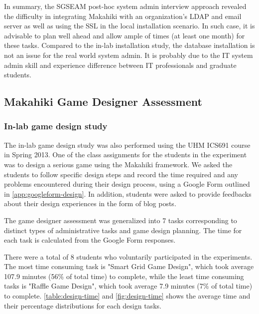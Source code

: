 In summary, the SGSEAM post-hoc system admin interview approach revealed the difficulty in integrating  Makahiki with an organization's LDAP and email server as well as using the SSL in the local installation scenario. In such case, it is advisable to plan well ahead and allow ample of times (at least one month) for these tasks.  Compared to the in-lab installation study, the database installation is not an issue for the real world system admin. It is probably due to the IT system admin skill and experience difference between  IT professionals and graduate students. 

\subsection{Makahiki Game Designer Assessment}

\subsubsection{In-lab game design study}

The in-lab game design study was also performed using the UHM ICS691 course in Spring 2013. One of the class assignments for the students in the experiment was to design a serious game using the Makahiki framework. We asked the students to follow specific design steps and record the time required and any problems encountered during their design process, using a Google Form outlined in \autoref{app:googleform-design}. In addition, students were asked to provide feedbacks about their
design experiences in the form of blog posts. 

The game designer assessment was generalized into 7 tasks corresponding to
distinct types of administrative tasks and game design planning. The time for each task is
calculated from the Google Form responses. 

There were a total of 8 students who voluntarily participated in the experiments. The most time consuming task is "Smart Grid Game Design", which took average 107.9 minutes (56\% of total time) to complete, while the least time consuming tasks is "Raffle Game Design", which took average 7.9 minutes (7\% of total time) to complete. \autoref{table:design-time} and \autoref{fig:design-time} shows the average time and their percentage distributions for each design tasks.

